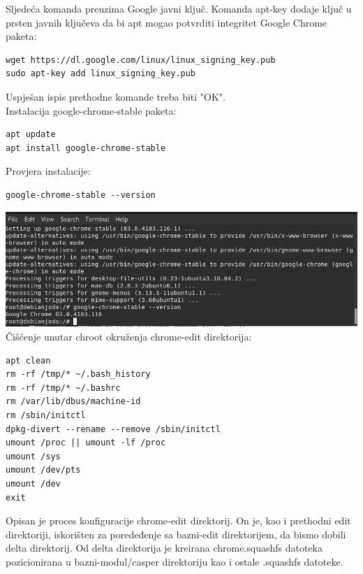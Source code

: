 \documentclass[12pt,vi]{mitthesis}
\begin{document}
\noindent
Sljedeća komanda preuzima Google javni ključ. Komanda apt-key dodaje ključ u prsten javnih ključeva da bi apt mogao potvrditi integritet Google Chrome paketa:\\
\begin{lstlisting}[style=BashInputStyle]
wget https://dl.google.com/linux/linux_signing_key.pub
sudo apt-key add linux_signing_key.pub
\end{lstlisting}
\noindent
Uspješan ispis prethodne komande treba biti "OK".\\
\noindent
Instalacija google-chrome-stable paketa:
\begin{lstlisting}[style=BashInputStyle]
apt update
apt install google-chrome-stable
\end{lstlisting}
\noindent
Provjera instalacije:
\begin{lstlisting}[style=BashInputStyle]
google-chrome-stable --version
\end{lstlisting}
\includegraphics[width=\linewidth]{images/googlechromestableversion.png}
\noindent
Čišćenje unutar chroot okruženja chrome-edit direktorija:
\begin{lstlisting}[style=BashInputStyle]
apt clean
rm -rf /tmp/* ~/.bash_history
rm -rf /tmp/* ~/.bashrc
rm /var/lib/dbus/machine-id
rm /sbin/initctl
dpkg-divert --rename --remove /sbin/initctl
umount /proc || umount -lf /proc
umount /sys
umount /dev/pts
umount /dev
exit
\end{lstlisting}
\indent
Opisan je proces konfiguracije chrome-edit direktorij. On je, kao i prethodni edit direktoriji, iskorišten za poredeđenje sa bazni-edit direktorijem, da bismo dobili delta direktorij. Od delta direktorija je kreirana chrome.squashfs datoteka pozicionirana u bazni-modul/casper direktoriju kao i ostale .squashfs datoteke.
\end{document}
